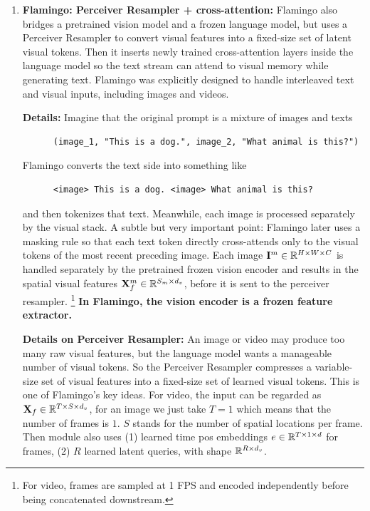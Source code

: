 \documentclass[11pt]{article}  %
\begin{document}
\begin{itemize}
\begin{enumerate}
    \item \textbf{Flamingo: Perceiver Resampler + cross-attention:} Flamingo also bridges a pretrained vision model and a frozen language model, but uses a Perceiver Resampler to convert visual features into a fixed-size set of latent visual tokens. Then it inserts newly trained cross-attention layers inside the language model so the text stream can attend to visual memory while generating text. Flamingo was explicitly designed to handle interleaved text and visual inputs, including images and videos.
    
    \textbf{Details:}
    Imagine that the original prompt is a mixture of images and texts
    \begin{lstlisting}
      (image_1, "This is a dog.", image_2, "What animal is this?")
    \end{lstlisting}
    Flamingo converts the text side into something like 
    \begin{lstlisting}
      <image> This is a dog. <image> What animal is this?
    \end{lstlisting}
    and then tokenizes that text. 
    Meanwhile, each image is processed separately by the visual stack.
    A subtle but very important point: Flamingo later uses a masking rule so that each text token directly cross-attends only to the visual tokens of the most recent preceding image.
    Each image $\mathbf{I}^m \in \mathbb{R}^{H \times W \times C}$ is handled separately by the pretrained frozen vision encoder and results in the spatial visual features $\mathbf{X}_f^m \in \mathbb{R}^{S_m \times d_v}$, before it is sent to the perceiver resampler. \footnote{For video, frames are sampled at 1 FPS and encoded independently before being concatenated downstream.} \textbf{In Flamingo, the vision encoder is a frozen feature extractor.}

    \textbf{Details on Perceiver Resampler:}
    An image or video may produce too many raw visual features, but the language model wants a manageable number of visual tokens.
    So the Perceiver Resampler compresses a variable-size set of visual features into a fixed-size set of learned visual tokens. This is one of Flamingo's key ideas.
    For video, the input can be regarded as $\mathbf{X}_f \in \mathbb{R}^{T \times S \times d_v}$, for an image we just take $T=1$ which means that the number of frames is $1$. $S$ stands for the number of spatial locations per frame.
    Then module also uses (1) learned time pos embeddings $e \in \mathbb{R}^{T \times 1 \times d}$ for frames, (2) $R$ learned latent queries, with shape $\mathbb{R}^{R \times d_v}$.


\end{enumerate}
\end{itemize}
\end{document}
